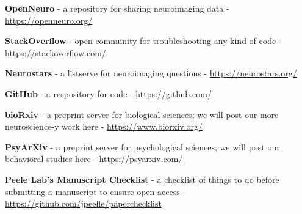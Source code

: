 \documentclass[]{book}
\begin{document}
\textbf{OpenNeuro} - a repository for sharing neuroimaging data - \url{https://openneuro.org/}

\textbf{StackOverflow} - open community for troubleshooting any kind of code - \url{https://stackoverflow.com/}

\textbf{Neurostars} - a listserve for neuroimaging questions - \url{https://neurostars.org/}

\textbf{GitHub} - a respository for code - \url{https://github.com/}

\textbf{bioRxiv} - a preprint server for biological sciences; we will post our more neuroscience-y work here - \url{https://www.biorxiv.org/}

\textbf{PsyArXiv} - a preprint server for psychological sciences; we will post our behavioral studies here - \url{https://psyarxiv.com/}

\textbf{Peele Lab's Manuscript Checklist} - a checklist of things to do before submitting a manuscript to ensure open access - \url{https://github.com/jpeelle/paperchecklist}


\end{document}
